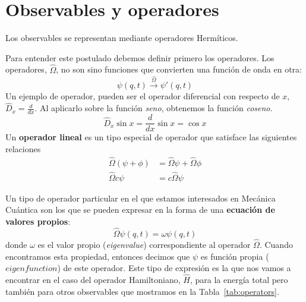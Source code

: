 \section{Observables y operadores}
\begin{theorem}
Los observables se representan mediante operadores 
Hermíticos.
\end{theorem}
Para entender este postulado debemos definir primero
los operadores. Los operadores, $\hat{\Omega}$, no son
sino funciones que convierten una función de onda 
en otra:
\begin{equation}
    \psi(q,t)\xrightarrow{\hat{\Omega}}\psi'(q,t)
\end{equation}
Un ejemplo de operador, pueden ser el operador
diferencial con respecto de $x$, $\hat{D}_x=\frac{d}{dx}$.
Al aplicarlo sobre la función \textit{seno}, obtenemos
la función \textit{coseno}.
\begin{equation}
    \hat{D}_x\sin x=\frac{d}{dx}\sin x =\cos x
\end{equation}
Un \textbf{operador lineal} es un tipo especial de operador
que satisface las siguientes relaciones
\begin{equation}
      \begin{array}{rl}
        \hat{\Omega}(\psi+\phi) &=\hat{\Omega}\psi + \hat{\Omega}\phi\\
        \hat{\Omega}c\psi &=c\hat{\Omega}\psi
    \end{array}
\end{equation}

Un tipo de operador particular en el que estamos 
interesados en Mecánica Cuántica son los que se pueden
expresar en la forma de una \textbf{ecuación de valores
propios}:
\begin{equation}
    \hat{\Omega}\psi(q,t)=\omega\psi(q,t)
\end{equation}
donde $\omega$ es el valor propio (\textit{eigenvalue})
correspondiente al operador $\hat{\Omega}$. Cuando
encontramos esta propiedad, entonces decimos que $\psi$ 
es función propia ($\textit{eigenfunction}$) de este
operador. Este tipo de expresión es la que nos vamos a
encontrar en el caso del operador Hamiltoniano, 
$\hat{H}$, para la energía total pero también para 
otros observables que mostramos en la 
Tabla~\ref{tab:operators}.

